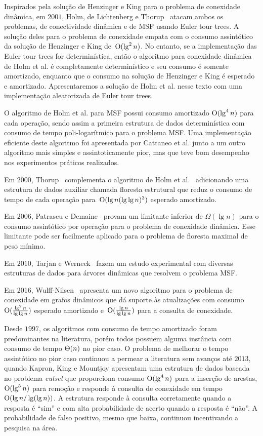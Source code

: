 Inspirados pela solução de Henzinger e King para o problema de conexidade dinâmica, em $2001$, Holm, de Lichtenberg e Thorup~\cite{poly_log} atacam ambos os problemas, de conectividade dinâmica e de MSF usando Euler tour trees.
A solução deles para o problema de conexidade empata com o consumo assintótico da solução de Henzinger e King de~$\mathrm{O}(\lg^2 n)$.
No entanto, se a implementação das Euler tour trees for determinística, então o algoritmo para conexidade dinâmica de Holm et al. é completamente determinístico e seu consumo é somente amortizado,
enquanto que o consumo na solução de Henzinger e King é esperado e amortizado. 
Apresentaremos a solução de Holm et al. nesse texto com uma implementação aleatorizada de Euler tour trees.

O algoritmo de Holm et al. para MSF possui consumo amortizado $\mathrm{O}(\lg^4 n)$ para cada operação, sendo assim a primeira estrutura de dados determinística com consumo de tempo poli-logarítmico para o problema MSF. Uma implementação eficiente deste algoritmo foi apresentada por Cattaneo et al. \cite{xpstudy2002} junto a um outro algoritmo mais simples e assintoticamente pior, mas que teve bom desempenho nos experimentos práticos realizados.

Em $2000$, Thorup~\cite{Thorup2000} complementa o algoritmo de Holm et al.~\cite{poly_log} adicionando uma estrutura de dados auxiliar chamada floresta estrutural que reduz o consumo de tempo de cada operação para~$\mathrm{O}(\lg n(\lg\lg n)^3)$ esperado amortizado.

Em $2006$, Patrascu e Demaine~\cite{lowerBoundPatrascu} provam um limitante inferior de $\Omega(\lg n)$ para o consumo assintótico por operação para o problema de conexidade dinâmica.
Esse limitante pode ser facilmente aplicado para o problema de floresta maximal de peso mínimo.

Em $2010$, Tarjan e Werneck~\cite{tarjanWerneck2010} fazem um estudo experimental com diversas estruturas de dados para árvores dinâmicas que resolvem o problema MSF.

Em 2016, Wulff-Nilsen~\cite{Wulff-Nilsen2016} apresenta um novo algoritmo para o problema de conexidade em grafos dinâmicos que dá suporte às atualizações com consumo~$\mathrm{O}(\frac{\lg^2 n}{\lg \lg n})$ esperado amortizado e~$\mathrm{O}(\frac{\lg n}{\lg \lg n})$ para a consulta de conexidade.

Desde $1997$, os algoritmos com consumo de tempo amortizado foram predominantes na literatura, porém todos possuem alguma instância com consumo de tempo $\Theta(n)$ no pior caso.
O problema de melhorar o tempo assintótico no pior caso continuou a permear a literatura sem avanços até $2013$, quando Kapron, King e Mountjoy \cite{bruceM} apresentam uma estrutura de dados baseada no problema \textit{cutset} que proporciona consumo $\mathrm{O}(\lg^4 n)$ para a inserção de arestas, $\mathrm{O}(\lg^5 n)$ para remoção e responde à consulta de conexidade em tempo~$\mathrm{O}(\lg n / \lg(\lg n))$.
A estrutura responde à consulta corretamente quando a resposta é “sim” e com alta probabilidade de acerto quando a resposta é “não”. A probabilidade de falso positivo, mesmo que baixa, continuou incentivando a pesquisa na área. 

